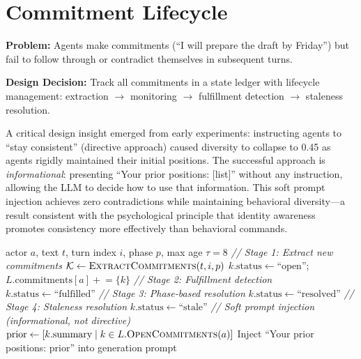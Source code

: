\section{Commitment Lifecycle}

\textbf{Problem:} Agents make commitments (``I will prepare the draft by Friday'') but fail to follow through or contradict themselves in subsequent turns.

\textbf{Design Decision:} Track all commitments in a state ledger with lifecycle management: extraction $\to$ monitoring $\to$ fulfillment detection $\to$ staleness resolution.

A critical design insight emerged from early experiments: instructing agents to ``stay consistent'' (directive approach) caused diversity to collapse to 0.45 as agents rigidly maintained their initial positions. The successful approach is \textit{informational}: presenting ``Your prior positions: [list]'' without any instruction, allowing the LLM to decide how to use that information. This soft prompt injection achieves zero contradictions while maintaining behavioral diversity---a result consistent with the psychological principle that identity awareness promotes consistency more effectively than behavioral commands.

\begin{algorithm}[t]
\caption{Commitment Lifecycle Management}
\label{alg:commitment}
\begin{algorithmic}[1]
\Require actor $a$, text $t$, turn index $i$, phase $p$, max age $\tau = 8$
\State \textit{// Stage 1: Extract new commitments}
\State $\mathcal{K} \gets \textsc{ExtractCommitments}(t, i, p)$ 
    \State $k.\text{status} \gets \text{``open''}$; \quad $L.\text{commitments}[a] \mathrel{+}= \{k\}$
\EndFor
\State \textit{// Stage 2: Fulfillment detection}
     
        \State $k.\text{status} \gets \text{``fulfilled''}$
    \EndIf
\EndFor
\State \textit{// Stage 3: Phase-based resolution}
    \State $k.\text{status} \gets \text{``resolved''}$
\EndFor
\State \textit{// Stage 4: Staleness resolution}
        \State $k.\text{status} \gets \text{``stale''}$
    \EndIf
\EndFor
\State \textit{// Soft prompt injection (informational, not directive)}
\State $\text{prior} \gets [k.\text{summary} \mid k \in L.\textsc{OpenCommitments}(a)]$
\State Inject ``Your prior positions: $\text{prior}$'' into generation prompt
\end{algorithmic}
\end{algorithm}


